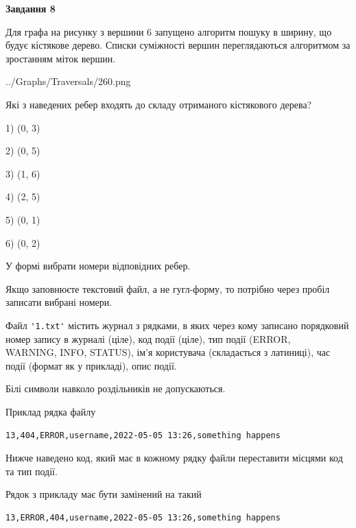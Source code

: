 \documentclass[12pt, ukrainian]{article}
\def\code#1{\Verb!#1!}
\begin{document}
{\begin {large}
{\begin {center}\textbf{Завдання 8}\end {center}}\par
Для графа на рисунку з вершини 6 запущено алгоритм пошуку в ширину, що будує кістякове дерево. Списки суміжності вершин переглядаються алгоритмом за зростанням міток вершин.\par
\begin{center}
	{../Graphs/Traversals/260.png}
\end{center}
\par Які з наведених ребер входять до складу отриманого кістякового дерева?\par
1) (0, 3)\par
2) (0, 5)\par
3) (1, 6)\par
4) (2, 5)\par
5) (0, 1)\par
6) (0, 2)\par
{\vskip 15pt} У формі вибрати номери відповідних ребер.


Якщо заповнюєте текстовий файл, а не гугл-форму, то потрібно через пробіл записа\-ти вибрані номери.\par
\newpage


Файл \code{'1.txt'} містить журнал з рядками, в яких через кому записано поряд\-ко\-вий номер запису в журналі (ціле), код події (ціле), тип події (ERROR,\\ WARNING, INFO, STATUS), ім'я користувача (складається з латиниці), час події (фор\-мат як у прикладі), опис події.

Білі символи навколо роздільників не допускаються.

Приклад рядка файлу



\begin{verbatim}
13,404,ERROR,username,2022-05-05 13:26,something happens
\end{verbatim}


Нижче наведено код, який має в кожному рядку файли переставити місцями код та тип події.

Рядок з прикладу має бути замінений на такий



\begin{verbatim}
13,ERROR,404,username,2022-05-05 13:26,something happens
\end{verbatim}





\end{large}}
\end{document}
